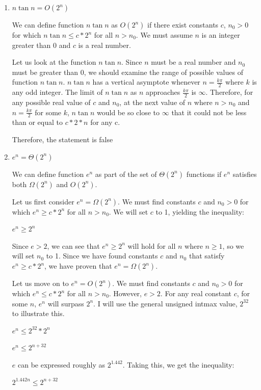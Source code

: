 \documentclass[11pt]{article}
\begin{document}
\begin{enumerate}
\item  $n \tan n = O(2^n)$

We can define function $n \tan n$ as $O(2^n)$ if there exist constants $c$, $n_0 > 0$ for which $n \tan n \leq c* 2^n$ for all $n > n_0$. 
We must assume $n$ is an integer greater than 0 and $c$ is a real number.

Let us look at the function $n \tan n$. Since $n$ must be a real number and $n_0$ must be greater than 0, we should examine the range of possible values of function $n \tan n$. 
$n \tan n$ has a vertical asymptote whenever $n = \frac{k\pi}{2}$ where $k$ is any odd integer. The limit of $n \tan n$ as $n$ approaches $\frac{k\pi}{2}$ is $\infty$. 
Therefore, for any possible real value of $c$ and $n_0$, at the next value of $n$ where $n > n_0$ and $n = \frac{k\pi}{2}$ for some $k$, 
$n \tan n$ would be so close to $\infty$ that it could not be less than or equal to $c * 2*n$ for any c.

Therefore, the statement is false

\item $e^n = \Theta(2^{n})$

We can define function $e^n$ as part of the set of $\Theta(2^{n})$ functions if $e^n$ satisfies both $\Omega(2^{n})$ and $O(2^{n})$. 

Let us first consider $e^n = \Omega(2^{n})$. We must find constants $c$ and $n_0 > 0$ for which $e^n \geq c * 2^n$ for all $n > n_0$. 
We will set $c$ to 1, yielding the inequality:

$e^n \geq 2^n$

Since $e > 2$, we can see that $e^n \geq 2^n$ will hold for all $n$ where $n \geq 1$, so we will set $n_0$ to 1. 
Since we have found constants $c$ and $n_0$ that satisfy $e^n \geq c * 2^n$, we have proven that $e^n = \Omega(2^{n})$.

Let us move on to $e^n = O(2^{n})$. We must find constants $c$ and $n_0 > 0$ for which $e^n \leq c * 2^n$ for all $n > n_0$. 
However, $e > 2$. For any real constant $c$, for some $n$, $e^n$ will surpass $2^n$. 
I will use the general unsigned intmax value, $2^{32}$ to illustrate this.

$e^n \leq 2^{32} * 2^n$

$e^n \leq 2^{n+32}$

$e$ can be expressed roughly as $2^{1.442}$. Taking this, we get the inequality:

$2^{1.442n} \leq 2^{n+32}$


\end{enumerate}
\end{document}
